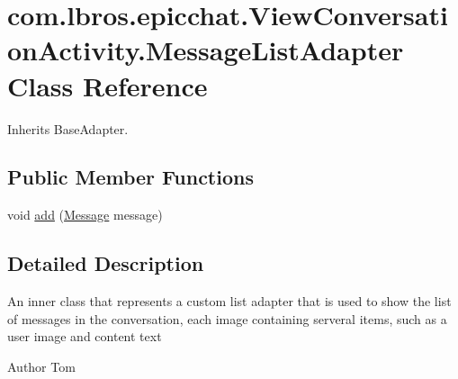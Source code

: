 \hypertarget{classcom_1_1lbros_1_1epicchat_1_1_view_conversation_activity_1_1_message_list_adapter}{\section{com.\-lbros.\-epicchat.\-View\-Conversation\-Activity.\-Message\-List\-Adapter Class Reference}
\label{classcom_1_1lbros_1_1epicchat_1_1_view_conversation_activity_1_1_message_list_adapter}
}


Inherits Base\-Adapter.

\subsection*{Public Member Functions}
\begin{DoxyCompactItemize}
\item 
void \hyperlink{classcom_1_1lbros_1_1epicchat_1_1_view_conversation_activity_1_1_message_list_adapter_a3462d0f7f2a4d3f514ecfb7e63f80e84}{add} (\hyperlink{classcom_1_1lbros_1_1epicchat_1_1_message}{Message} message)
\end{DoxyCompactItemize}


\subsection{Detailed Description}
An inner class that represents a custom list adapter that is used to show the list of messages in the conversation, each image containing serveral items, such as a user image and content text \begin{DoxyAuthor}{Author}
Tom 
\end{DoxyAuthor}


